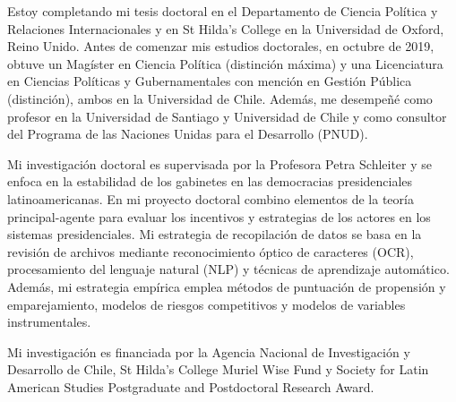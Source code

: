 




\vspace{3mm}

\begin{cvparagraph}

Estoy completando mi tesis doctoral en el Departamento de Ciencia Política y Relaciones Internacionales y en St Hilda’s College en la Universidad de Oxford, Reino Unido.  Antes de comenzar mis estudios doctorales, en octubre de 2019, obtuve un Magíster en Ciencia Política (distinción máxima) y una Licenciatura en Ciencias Políticas y Gubernamentales con mención en Gestión Pública (distinción), ambos en la Universidad de Chile. Además, me desempeñé como profesor en la Universidad de Santiago y Universidad de Chile y como consultor del Programa de las Naciones Unidas para el Desarrollo (PNUD).

Mi investigación doctoral es supervisada por la Profesora Petra Schleiter y se enfoca en la estabilidad de los gabinetes en las democracias presidenciales latinoamericanas. En mi proyecto doctoral combino elementos de la teoría principal-agente para evaluar los incentivos y estrategias de los actores en los sistemas presidenciales. Mi estrategia de recopilación de datos se basa en la revisión de archivos mediante reconocimiento óptico de caracteres (OCR), procesamiento del lenguaje natural (NLP) y técnicas de aprendizaje automático. Además, mi estrategia empírica emplea métodos de puntuación de propensión y emparejamiento, modelos de riesgos competitivos y modelos de variables instrumentales. 

Mi investigación es financiada por la Agencia Nacional de Investigación y Desarrollo de Chile, St Hilda's College Muriel Wise Fund y Society for Latin American Studies Postgraduate and Postdoctoral Research Award.
\vspace{1mm}
\end{cvparagraph}